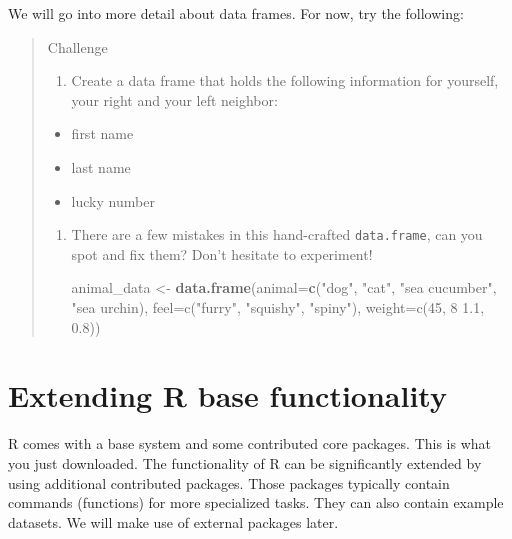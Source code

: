 \documentclass[
]{book}
\newenvironment{Shaded}{\begin{snugshade}}{\end{snugshade}}
\newcommand{\AttributeTok}[1]{\textcolor[rgb]{0.13,0.29,0.53}{#1}}
\newcommand{\FunctionTok}[1]{\textcolor[rgb]{0.13,0.29,0.53}{\textbf{#1}}}
\newcommand{\NormalTok}[1]{#1}
\newcommand{\OtherTok}[1]{\textcolor[rgb]{0.56,0.35,0.01}{#1}}
\newcommand{\StringTok}[1]{\textcolor[rgb]{0.31,0.60,0.02}{#1}}
\providecommand{\tightlist}{%
  \setlength{\itemsep}{0pt}\setlength{\parskip}{0pt}}
\begin{document}
We will go into more detail about data frames. For now, try the following:

\begin{quote}
Challenge

\begin{enumerate}
\def\labelenumi{\arabic{enumi}.}
\tightlist
\item
  Create a data frame that holds the following information for yourself,
  your right and your left neighbor:
\end{enumerate}

\begin{itemize}
\tightlist
\item
  first name
\item
  last name
\item
  lucky number
\end{itemize}

\begin{enumerate}
\def\labelenumi{\arabic{enumi}.}
\setcounter{enumi}{1}
\item
  There are
  a few mistakes in this hand-crafted \texttt{data.frame}, can you spot and fix them?
  Don't hesitate to experiment!

\begin{Shaded}
\begin{Highlighting}[]
\NormalTok{animal\_data }\OtherTok{\textless{}{-}} \FunctionTok{data.frame}\NormalTok{(}\AttributeTok{animal=}\FunctionTok{c}\NormalTok{(}\StringTok{"dog"}\NormalTok{, }\StringTok{"cat"}\NormalTok{, }\StringTok{"sea cucumber"}\NormalTok{, }\StringTok{"sea urchin),}
\StringTok{                          feel=c("}\NormalTok{furry}\StringTok{", "}\NormalTok{squishy}\StringTok{", "}\NormalTok{spiny}\StringTok{"),}
\StringTok{                          weight=c(45, 8 1.1, 0.8))}
\end{Highlighting}
\end{Shaded}
\end{enumerate}
\end{quote}

\hypertarget{extending-r-base-functionality}{%
\section{Extending R base functionality}\label{extending-r-base-functionality}}

R comes with a base system and some contributed core packages. This is what you just downloaded. The functionality of R can be significantly extended by using additional contributed packages. Those packages typically contain commands (functions) for more specialized tasks. They can also contain example datasets. We will make use of external packages later.
\end{document}
